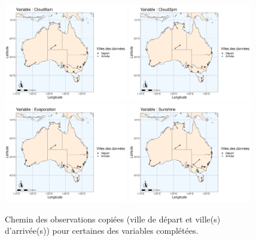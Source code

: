 \documentclass{article}
\begin{document}
\begin{figure}[H]
    \centering
    \includegraphics[width=0.48\textwidth]{Images/Australia_map_segments_complete/Australia_map_segments_complete-1.jpg}
    \includegraphics[width=0.48\textwidth]{Images/Australia_map_segments_complete/Australia_map_segments_complete-2.jpg}
    \includegraphics[width=0.48\textwidth]{Images/Australia_map_segments_complete/Australia_map_segments_complete-3.jpg}
    \includegraphics[width=0.48\textwidth]{Images/Australia_map_segments_complete/Australia_map_segments_complete-4.jpg}
    \caption{Chemin des observations copiées (ville de départ et ville(s) d'arrivée(s)) pour certaines des variables complétées.}
\end{figure}
\end{document}
